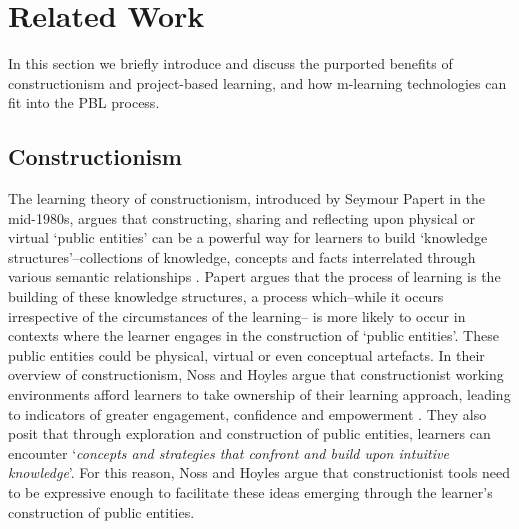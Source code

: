 \documentclass[,hyphens]{sigchi}
\begin{document}
\section{Related Work}
In this section we briefly introduce and discuss the purported benefits of constructionism and project-based learning, and how m-learning technologies can fit into the PBL process.

\subsection{Constructionism}
The learning theory of constructionism, introduced by Seymour Papert in the mid-1980s, argues that constructing, sharing and reflecting upon physical or virtual `public entities' can be a powerful way for learners to build `knowledge structures'--collections of knowledge, concepts and facts interrelated through various semantic relationships \cite{PapertSeymourandHarel1991a}. Papert argues that the process of learning is the building of these knowledge structures, a process which--while it occurs irrespective of the circumstances of the learning-- is more likely to occur in contexts where the learner engages in the construction of `public entities'. These public entities could be physical, virtual or even conceptual artefacts. In their overview of constructionism, Noss and Hoyles argue that constructionist working environments afford learners to take ownership of their learning approach, leading to indicators of greater engagement, confidence and empowerment \cite{Noss2017}. They also posit that through exploration and construction of public entities, learners can encounter `\textit{concepts and strategies that confront and build upon intuitive knowledge}'. For this reason, Noss and Hoyles argue that constructionist tools need to be expressive enough to facilitate these ideas emerging through the learner's construction of public entities.
\end{document}
